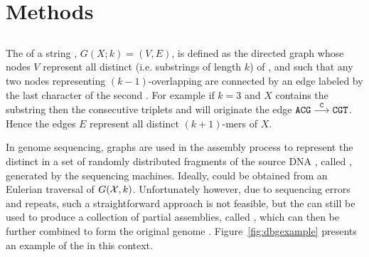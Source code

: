 \chapter{Methods}



\section{}
\label{sec:dBG}


The  of a string , $G(X;k)=(V,E)$, is defined as the directed graph whose nodes $V$ represent all distinct  (i.e. substrings of length $k$) of , and such that any two nodes representing $(k-1)$-overlapping  are connected by an edge labeled by the last character of the second \kmer. For example if $k=3$ and $X$ contains the substring  then the consecutive triplets  and  will originate the edge $\mathtt{ACG}\stackrel{\mathtt{C}}{\longrightarrow}\mathtt{CGT}$. Hence the edges $E$ represent all distinct $(k+1)$-mers of $X$. 

In genome sequencing, \dB graphs are used in the assembly process to represent the distinct  in a set \readset of randomly distributed fragments of the source DNA , called , generated by the sequencing machines. Ideally,  could be obtained from an Eulerian traversal of $G(\readset, k)$. Unfortunately however, due to sequencing errors and repeats, such a straightforward approach is not feasible, but the \dBG can still be used to produce a collection of partial assemblies, called , which can then be further combined to form the original genome \cite{Pevzner2001}. Figure~\ref{fig:dbgexample} presents an example of the \dBG in this context.

